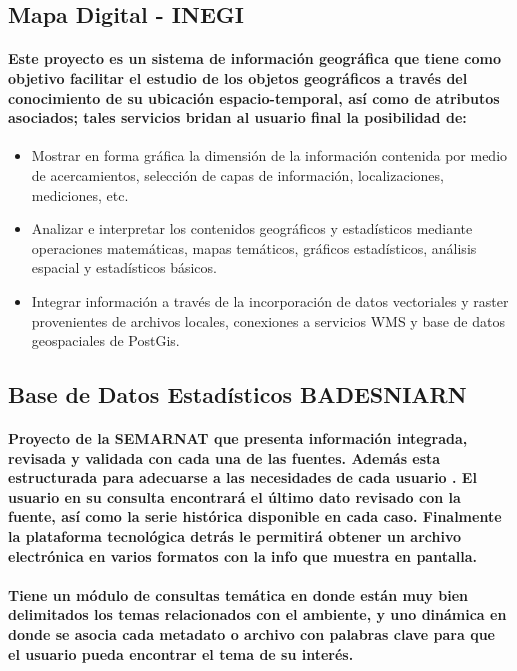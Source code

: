 \subsection {Mapa Digital -  INEGI}
\paragraph {Este proyecto es un sistema de información geográfica que tiene como objetivo facilitar el estudio de los objetos geográficos a través del conocimiento de su ubicación espacio-temporal, así como de atributos asociados;  tales servicios bridan al usuario final la posibilidad de:}
\begin{itemize}
\item {Mostrar en forma gráfica la dimensión de la información contenida por medio de acercamientos, selección de capas de información, localizaciones, mediciones, etc.}
\item {Analizar e interpretar los contenidos geográficos y estadísticos mediante operaciones matemáticas, mapas temáticos, gráficos estadísticos, análisis espacial y estadísticos básicos.}
\item {Integrar información a través de la incorporación de datos vectoriales y raster provenientes de archivos locales, conexiones a servicios WMS y base de datos geospaciales de PostGis.}
\end{itemize}
\subsection {Base de Datos Estadísticos BADESNIARN}
\paragraph {Proyecto de la SEMARNAT que presenta información integrada, revisada y validada con cada una de las fuentes. Además esta estructurada para adecuarse a las necesidades de cada usuario . El usuario en su consulta encontrará el último dato revisado con la fuente, así como la serie histórica disponible en cada caso. Finalmente la plataforma tecnológica detrás le permitirá obtener un archivo electrónica en varios formatos con la info que muestra en pantalla.}
\paragraph { Tiene un módulo de consultas temática en donde están muy bien delimitados los temas relacionados con el ambiente, y uno dinámica en donde se asocia cada metadato o archivo con palabras clave para que el usuario pueda encontrar el tema de su interés.}
